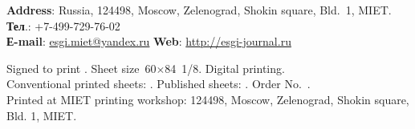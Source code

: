 \begin{otherlanguage}{english}
\begin{flushleft}
    \scriptsize
    \textbf{Address}: Russia, 124498, Moscow, Zelenograd, Shokin square, Bld. 1, MIET.\\
    \textbf{Тел}.: +7-499-729-76-02\\
    \textbf{Е-mail}: \href{mailto:esgi.miet@yandex.ru}{esgi.miet@yandex.ru} \hspace{3em}
    \textbf{Web}: \url{http://esgi-journal.ru}

     \vspace{1em}
    Signed to print \esgiPDate. Sheet size 60\(×\)84 1/8. Digital printing.\\
    Conventional printed sheets: \esgiUPL{}. Published sheets: \esgiUIL{}. Order No.~\esgiPRN{}.\\
    Printed at MIET printing workshop: 124498, Moscow, Zelenograd, Shokin square, Bld. 1, MIET.
\end{flushleft}

\end{otherlanguage}

\normalsize
\setmainlinespread

\restoregeometry